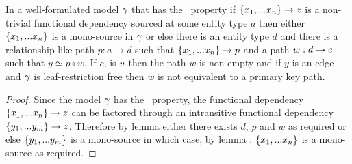 \begin{lemma}
In a well-formulated model $\gamma$ that has the \fdfactoring\ property if $\left\{x_1,...x_n\right\} \rightarrow z$ is a non-trivial  functional dependency sourced
at some entity type $a$ then either $\left\{x_1,...x_n\right\}$ is a mono-source in $\gamma$
or else there is an entity type $d$ and there is a relationship-like path $p:a \rightarrow d$ such that $\{x_1,...x_n\} \rightarrow p$
and a  path $w:d \rightarrow c$  such that $y \simeq p \circ w$. If  $c$, is $v$ then
the path $w$ is non-empty and if $y$ is an edge and $\gamma$ is leaf-restriction free then $w$ is not equivalent to a primary key path.
\end{lemma}
\begin{proof}
Since the model $\gamma$  has the \fdfactoring\ property, the functional dependency $\left\{x_1,...x_n\right\} \rightarrow z$ can be factored through an intransitive functional
dependency $\left\{y_1,...y_m\right\} \rightarrow z$. Therefore by lemma  either there exists $d$, $p$ and $w$ as required
or else  $\left\{y_1,...y_m\right\}$ is a mono-source in which case, by lemma , $\left\{x_1,...x_n\right\}$ is a mono-source as required.
\end{proof}

